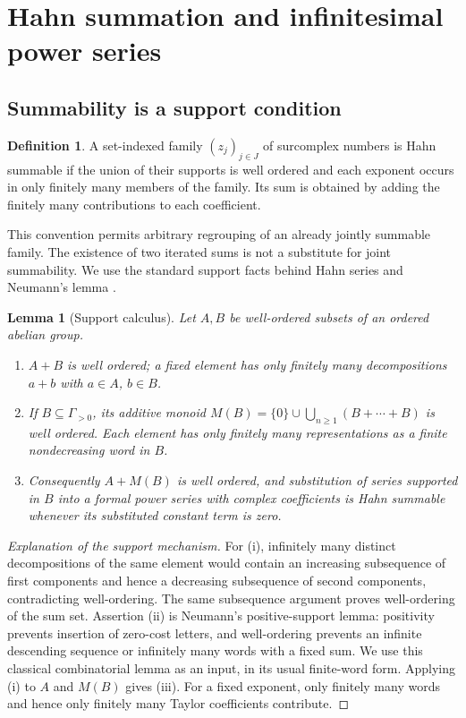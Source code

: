 \documentclass[11pt,letterpaper]{article}
\numberwithin{equation}{section}
\newtheorem{lemma}[theorem]{Lemma}
\theoremstyle{definition}
\newtheorem{definition}[theorem]{Definition}
\theoremstyle{remark}
\begin{document}
\section{Hahn summation and infinitesimal power series}\label{sec:sums}

\subsection{Summability is a support condition}

\begin{definition}\label{def:summable}
A set-indexed family $(z_j)_{j\in J}$ of surcomplex numbers is Hahn summable
if the union of their supports is well ordered and each exponent occurs in
only finitely many members of the family. Its sum is obtained by adding the
finitely many contributions to each coefficient.
\end{definition}

This convention permits arbitrary regrouping of an already jointly summable
family. The existence of two iterated sums is not a substitute for joint
summability. We use the standard support facts behind Hahn series and
Neumann's lemma \cite{Neumann,vdH,BMgerms}.

\begin{lemma}[Support calculus]\label{lem:neumann}
Let $A,B$ be well-ordered subsets of an ordered abelian group.
\begin{enumerate}[label=(\roman*)]
\item $A+B$ is well ordered; a fixed element has only finitely many
decompositions $a+b$ with $a\in A$, $b\in B$.
\item If $B\subseteq\Gamma_{>0}$, its additive monoid
$M(B)=\{0\}\cup\bigcup_{n\ge1}(B+\cdots+B)$ is well ordered. Each element
has only finitely many representations as a finite nondecreasing word in $B$.
\item Consequently $A+M(B)$ is well ordered, and substitution of series
supported in $B$ into a formal power series with complex coefficients is
Hahn summable whenever its substituted constant term is zero.
\end{enumerate}
\end{lemma}
\begin{proof}[Explanation of the support mechanism]
For (i), infinitely many distinct decompositions of the same element would
contain an increasing subsequence of first components and hence a decreasing
subsequence of second components, contradicting well-ordering. The same
subsequence argument proves well-ordering of the sum set. Assertion (ii) is
Neumann's positive-support lemma: positivity prevents insertion of zero-cost
letters, and well-ordering prevents an infinite descending sequence or
infinitely many words with a fixed sum. We use this classical combinatorial
lemma as an input, in its usual finite-word form. Applying (i) to $A$ and
$M(B)$ gives (iii). For a fixed exponent, only finitely many words and hence
only finitely many Taylor coefficients contribute.
\end{proof}
\end{document}

